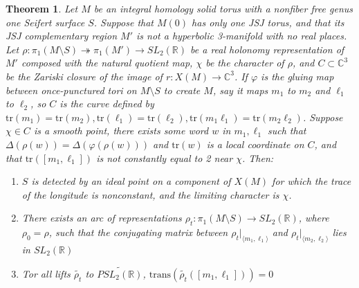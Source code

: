\documentclass{article}
\theoremstyle{plain}
\newtheorem{theorem}{Theorem}[section]
\theoremstyle{definition}
\theoremstyle{plain}
\theoremstyle{plain}
\theoremstyle{plain}
\theoremstyle{remark}
\theoremstyle{remark}
\theoremstyle{plain}
\theoremstyle{plain}
\begin{document}
\begin{theorem}\label{thm:arc}
Let $M$ be an integral homology solid torus with a nonfiber free genus one Seifert surface $S$. Suppose that $M(0)$ has only one JSJ torus, and that its JSJ complementary region $M'$ is not a hyperbolic 3-manifold with no real places. Let $\rho: \pi_1(M \setminus S) \twoheadrightarrow \pi_1(M') \to SL_2(\mathbb{R})$ be a real holonomy representation of $M'$ composed with the natural quotient map, $\chi$ be the character of $\rho$, and $C \subset \mathbb{C}^3$ be the Zariski closure of the image of $r: X(M) \to \mathbb{C}^3$. If $\varphi$ is the gluing map between once-punctured tori on $M \setminus S$ to create $M$, say it maps $m_1$ to $m_2$ and $\ell_1$ to $\ell_2$, so $C$ is the curve defined by $\text{tr}(m_1) = \text{tr}(m_2), \text{tr}(\ell_1) = \text{tr}(\ell_2), \text{tr}(m_1\ell_1) = \text{tr}(m_2\ell_2)$. Suppose $\chi \in C$ is a smooth point, there exists some word $w$ in $m_1, \ell_1$ such that $\Delta(\rho(w)) = \Delta(\varphi(\rho(w)))$ and $\text{tr}(w)$ is a local coordinate on $C$, and that $\text{tr}([m_1, \ell_1])$ is not constantly equal to 2 near $\chi$. Then:
\begin{enumerate}
	\item $S$ is detected by an ideal point on a component of $X(M)$ for which the trace of the longitude is nonconstant, and the limiting character is $\chi$.
	\item There exists an arc of representations $\rho_t: \pi_1(M \setminus S) \to SL_2(\mathbb{R})$, where $\rho_0 = \rho$, such that the conjugating matrix between $\rho_t|_{\langle m_1, \ell_1 \rangle}$ and $\rho_t|_{\langle m_2, \ell_2 \rangle}$ lies in $SL_2(\mathbb{R})$
	\item Tor all lifts $\widetilde{\rho_t}$ to $\widetilde{PSL_2(\mathbb{R})}$, $\text{trans}(\widetilde{\rho_t}([m_1, \ell_1])) = 0$
\end{enumerate} 
\end{theorem}
\end{document}
